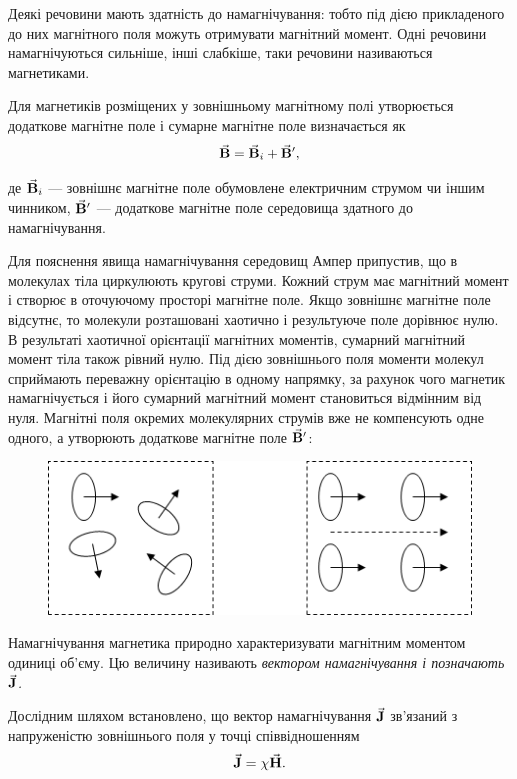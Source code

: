 Деякі речовини мають здатність до намагнічування: тобто під дією прикладеного до них магнітного поля можуть отримувати магнітний момент. Одні речовини намагнічуються сильніше, інші слабкіше, таки речовини називаються магнетиками. \medskip

Для магнетиків розміщених у зовнішньому магнітному полі утворюється додаткове магнітне поле і сумарне магнітне поле визначається як
\begin{equation}
	{\vec{\mathbf{B}}} = {\vec{\mathbf{B}}}_i + {\vec{\mathbf{B}}}',
\end{equation}

де ${\vec{\mathbf{B}}}_i$ --- зовнішнє магнітне поле обумовлене електричним струмом чи іншим чинником, ${\vec{\mathbf{B}}}'$ --- додаткове магнітне поле середовища здатного до намагнічування.  \medskip

Для пояснення явища намагнічування середовищ Ампер припустив, що в молекулах тіла циркулюють кругові струми. Кожний струм має магнітний момент і створює в оточуючому просторі магнітне поле. Якщо зовнішнє магнітне поле відсутнє, то молекули розташовані хаотично і результуюче поле дорівнює нулю.  В результаті хаотичної орієнтації магнітних моментів, сумарний магнітний момент  тіла також рівний нулю. Під дією зовнішнього поля моменти молекул сприймають переважну орієнтацію в одному напрямку, за рахунок чого магнетик намагнічується і його сумарний магнітний момент становиться відмінним від нуля. Магнітні поля окремих молекулярних струмів вже не компенсують одне одного, а утворюють додаткове магнітне поле ${\vec{\mathbf{B}}}'$:
\begin{figure}[H]
	\centering
	\includegraphics[]{img/13-4.png}
\end{figure}

\begin{definition}
	Намагнічування магнетика природно характеризувати магнітним моментом одиниці об'єму. Цю величину називають \it{вектором намагнічування} і позначають ${\vec{\mathbf{J}}}$.
\end{definition}

\begin{remark}
	Дослідним шляхом встановлено, що вектор намагнічування ${\vec{\mathbf{J}}}$ зв'язаний з напруженістю зовнішнього поля у точці співвідношенням
	\begin{equation}
		{\vec{\mathbf{J}}} = \chi {\vec{\mathbf{H}}}.
	\end{equation}
\end{remark}

